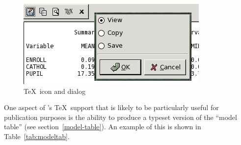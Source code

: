 \begin{figure}[htbp]
  \caption{\TeX\ icon and dialog}
  \label{fig:tex-icon}
    \begin{center}
      \includegraphics[scale=0.75]{figures/texdialog} 
    \end{center}
\end{figure}

One aspect of 's \TeX\ support that is likely to be
particularly useful for publication purposes is the ability to produce
a typeset version of the ``model table'' (see
section~\ref{model-table}).  An example of this is shown in
Table~\ref{tab:modeltab}.

